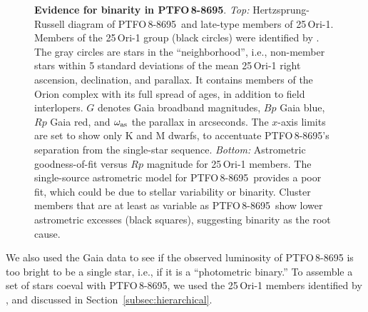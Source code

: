 \documentclass[12pt,twocolumn,tighten]{aastex62}
\newcommand{\ptfo}{PTFO$\,$8-8695}
\begin{document}
\begin{figure}[t]
\begin{center}
		\vspace{-0.7cm}
	\end{center}
	\vspace{-0.7cm}
	\caption{ {\bf Evidence for binarity in \ptfo}.
    {\it Top:} Hertzsprung-Russell diagram of \ptfo\ and late-type
    members of 25$\,$Ori-1. Members of the 25$\,$Ori-1 group (black
    circles) were identified by \citet{kounkel_apogee2_2018}.  The
    gray circles are stars in the ``neighborhood'', i.e.,
    non-member stars within 5
    standard deviations of the mean 25$\,$Ori-1 right ascension,
    declination, and parallax.  It contains members of the Orion
    complex with its full spread of ages, in addition to field
    interlopers.  $G$ denotes Gaia broadband magnitudes, $Bp$ Gaia
    blue, $Rp$ Gaia red, and $\omega_{\rm as}$ the parallax in
    arcseconds.  The $x$-axis limits are set to show only K and
    M dwarfs, to accentuate \ptfo's separation from the
    single-star sequence.  {\it Bottom:} Astrometric goodness-of-fit
    versus $Rp$ magnitude for 25$\,$Ori-1 members.  The single-source
    astrometric model for \ptfo\ provides a poor fit, which could be due to
    stellar variability or binarity.  Cluster members that
    are at least as variable as \ptfo\ show lower astrometric excesses
    (black squares), suggesting binarity as the root cause.
		\label{fig:gaia}
	}
\end{figure}


We also used the Gaia data to see if the observed luminosity of \ptfo
is too bright to be a single star, i.e., if it is a ``photometric
binary.''
To assemble a set of stars coeval with \ptfo,
we used the 25$\,$Ori-1 members identified by
\citet{kounkel_apogee2_2018}, and discussed in
Section~\ref{subsec:hierarchical}.
\end{document}
